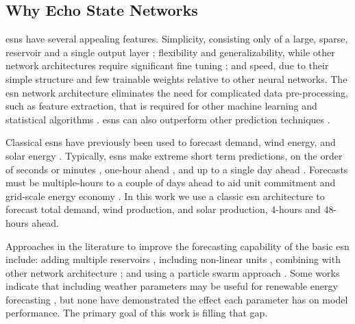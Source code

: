 \subsection{Why Echo State Networks}
\glspl{esn} have several appealing features. Simplicity, consisting only
of a large, sparse, reservoir and a single output layer
\cite{lukosevicius_practical_2012}; flexibility and generalizability,
while other network architectures require significant fine tuning
\cite{liu_deterministic_2019}; and speed, due to their simple structure and
few trainable weights relative to other neural networks. The \gls{esn} network
architecture eliminates the need for complicated data pre-processing, such as
feature extraction, that is required for other machine learning  and statistical
algorithms \cite{lazos_optimisation_2014, chen_day-ahead_2017}.
\glspl{esn} can also outperform other prediction techniques
\cite{jayawardene_comparison_2014,jayawardene_comparison_2015,shi_energy_2016,chitsazan_wind_2019, hu_forecasting_2020}.

Classical \glspl{esn} have previously been used to forecast demand, wind
energy, and solar energy
\cite{deihimi_application_2012,jayawardene_comparison_2015,hu_forecasting_2020}.
Typically, \glspl{esn} make extreme short term predictions, on the
order of seconds or minutes
\cite{chen_novel_2019,wang_echo_2019,chitsazan_wind_2019}, one-hour ahead
\cite{shi_energy_2016}, and up to a single day ahead
\cite{deihimi_application_2012}. Forecasts must be multiple-hours to a
couple of days ahead to aid unit commitment and grid-scale energy economy
\cite{wang_quantifying_2016,mc_garrigle_quantifying_2015,brancucci_martinez-anido_value_2016}. In this work we use a classic \gls{esn} architecture to
forecast total demand, wind production, and solar production, 4-hours and 48-
hours ahead.

Approaches in the literature to improve the forecasting capability of
the basic \gls{esn} include: adding multiple reservoirs
\cite{hu_forecasting_2020,gallicchio_deep_2019,yao_novel_2019,li_multi-reservoir_2020}, including non-linear units \cite{holzmann_echo_2008, chitsazan_wind_2019}, combining with other network architecture
\cite{chen_novel_2019, lopez_wind_2018}; and using a particle swarm approach
\cite{chouikhi_pso-based_2017,wang_echo_2019}. Some works indicate that
including weather parameters may be useful for renewable energy forecasting
\cite{li_echo_2019,chitsazan_wind_2019}, but none have demonstrated the effect
each parameter has on model performance. The primary goal of this work
is filling that gap.

